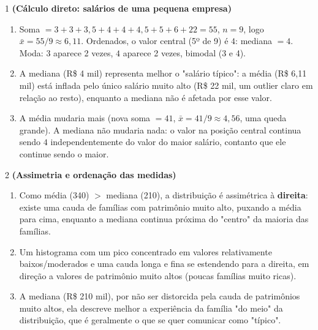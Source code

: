 \documentclass[11pt]{article}
\begin{document}

\begin{questao}{1} \textbf{(Cálculo direto: salários de uma pequena empresa)}
\begin{solucao}
\begin{enumerate}[label=(\alph*)]
  \item Soma $=3+3+3{,}5+4+4+4{,}5+5+6+22=55$, $n=9$, logo $\bar x = 55/9 \approx 6{,}11$.
    Ordenados, o valor central (5º de 9) é $4$: mediana $=4$. Moda: $3$ aparece 2 vezes, $4$
    aparece 2 vezes, bimodal (3 e 4).
  \item A mediana (R\$ 4 mil) representa melhor o "salário típico": a média (R\$ 6,11 mil) está
    inflada pelo único salário muito alto (R\$ 22 mil, um outlier claro em relação ao resto),
    enquanto a mediana não é afetada por esse valor.
  \item A média mudaria mais (nova soma $=41$, $\bar x = 41/9\approx 4{,}56$, uma queda grande). A
    mediana não mudaria nada: o valor na posição central continua sendo $4$ independentemente do
    valor do maior salário, contanto que ele continue sendo o maior.
\end{enumerate}
\end{solucao}
\end{questao}

\begin{questao}{2} \textbf{(Assimetria e ordenação das medidas)}
\begin{solucao}
\begin{enumerate}[label=(\alph*)]
  \item Como média (340) $>$ mediana (210), a distribuição é assimétrica à \textbf{direita}: existe uma
    cauda de famílias com patrimônio muito alto, puxando a média para cima, enquanto a mediana
    continua próxima do "centro" da maioria das famílias.
  \item Um histograma com um pico concentrado em valores relativamente baixos/moderados e uma
    cauda longa e fina se estendendo para a direita, em direção a valores de patrimônio muito
    altos (poucas famílias muito ricas).
  \item A mediana (R\$ 210 mil), por não ser distorcida pela cauda de patrimônios muito altos, ela
    descreve melhor a experiência da família "do meio" da distribuição, que é geralmente o que se
    quer comunicar como "típico".
\end{enumerate}
\end{solucao}
\end{questao}
\end{document}
